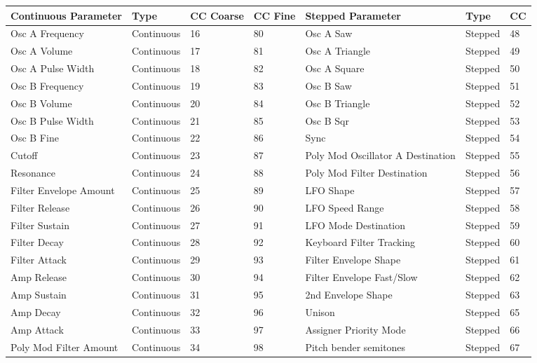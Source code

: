 \begin{longtable}[l]{ p{5cm}|p{2cm}|p{1.5cm}|p{1.5cm}|p{5cm}|p{2cm}|p{1cm}} 
\textbf{Continuous Parameter} & \textbf{Type} & \textbf{ CC Coarse} & \textbf{CC Fine} & \textbf{Stepped Parameter} & \textbf{Type} & \textbf{CC} \\ \hline
Osc A Frequency & Continuous & 16 & 80 & Osc A Saw & Stepped & 48 \\ \hline
Osc A Volume & Continuous & 17 & 81 & Osc A Triangle & Stepped & 49 \\ \hline
Osc A Pulse Width & Continuous & 18 & 82 & Osc A Square & Stepped & 50 \\ \hline
Osc B Frequency & Continuous & 19 & 83 & Osc B Saw & Stepped & 51 \\ \hline
Osc B Volume & Continuous & 20 & 84 & Osc B Triangle & Stepped & 52 \\ \hline
Osc B Pulse Width & Continuous & 21 & 85 & Osc B Sqr & Stepped & 53 \\ \hline
Osc B Fine & Continuous & 22 & 86 & Sync & Stepped & 54 \\ \hline
Cutoff & Continuous & 23 & 87 & Poly Mod Oscillator A Destination & Stepped & 55 \\ \hline
Resonance & Continuous & 24 & 88 & Poly Mod Filter Destination & Stepped & 56 \\ \hline
Filter Envelope Amount & Continuous & 25 & 89 & LFO Shape & Stepped & 57 \\ \hline
Filter Release & Continuous & 26 & 90 & LFO Speed Range & Stepped & 58 \\ \hline
Filter Sustain & Continuous & 27 & 91 & LFO Mode Destination & Stepped & 59 \\ \hline
Filter Decay & Continuous & 28 & 92 & Keyboard Filter Tracking & Stepped & 60 \\ \hline
Filter Attack & Continuous & 29 & 93 & Filter Envelope Shape & Stepped & 61 \\ \hline
Amp Release & Continuous & 30 & 94 & Filter Envelope Fast/Slow & Stepped & 62 \\ \hline
Amp Sustain & Continuous & 31 & 95 & 2nd Envelope Shape & Stepped & 63 \\ \hline
Amp Decay & Continuous & 32 & 96 & Unison & Stepped & 65 \\ \hline
Amp Attack & Continuous & 33 & 97 & Assigner Priority Mode & Stepped & 66 \\ \hline
Poly Mod Filter Amount & Continuous & 34 & 98 & Pitch bender semitones & Stepped & 67 \\ \hline

\end{longtable}
